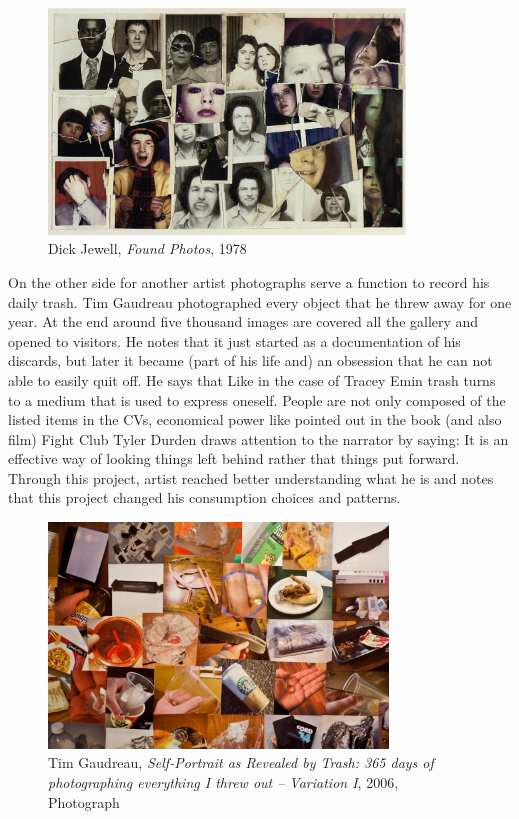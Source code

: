 \begin{figure}[h!]
  \centering
  \includegraphics[height=6cm]{graphics/DickJewell_FoundPhotos.jpg}
  \caption{Dick Jewell, \textit{Found Photos}, 1978}
  \label{fig:DickJewell_FoundPhotos}
\end{figure}

On the other side for another artist photographs serve a function to record his daily trash. Tim Gaudreau photographed every object that he threw away for one year. At the end around five thousand images are covered all the gallery and opened to visitors. He notes that it just started as a documentation of his discards, but later it became (part of his life and) an obsession that he can not able to easily quit off. He says that  Like in the case of Tracey Emin trash turns to a medium that is used to express oneself. People are not only composed of the listed items in the CVs, economical power like pointed out in the book (and also film) Fight Club Tyler Durden draws attention to the narrator by saying:  It is an effective way of looking things left behind rather that things put forward. Through this project, artist reached better understanding what he is and notes that this project changed his consumption choices and patterns.

\begin{figure}[h!]
  \centering
  \includegraphics[height=6cm]{graphics/TimGaudreau_SelfPotraitRevealedByTrash.jpg}
  \caption{Tim Gaudreau, \textit{Self-Portrait as Revealed by Trash: 365 days of photographing everything I threw out – Variation I}, 2006, Photograph}
  \label{fig:TimGaudreau_SelfPotraitRevealedByTrash}
\end{figure}

